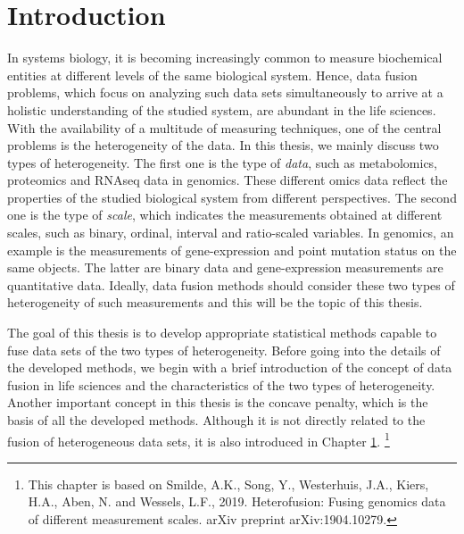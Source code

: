 \chapter{Introduction} \label{chapter:1}
In systems biology, it is becoming increasingly common to measure biochemical entities at different levels of the same biological system. Hence, data fusion problems, which focus on analyzing such data sets simultaneously to arrive at a holistic understanding of the studied system, are abundant in the life sciences. With the availability of a multitude of measuring techniques, one of the central problems is the heterogeneity of the data. In this thesis, we mainly discuss two types of heterogeneity. The first one is the type of \emph{data}, such as metabolomics, proteomics and RNAseq data in genomics. These different omics data reflect the properties of the studied biological system from different perspectives. The second one is the type of \emph{scale}, which indicates the measurements obtained at different scales, such as binary, ordinal, interval and ratio-scaled variables. In genomics, an example is the measurements of gene-expression and point mutation status on the same objects. The latter are binary data and gene-expression measurements are quantitative data. Ideally, data fusion methods should consider these two types of heterogeneity of such measurements and this will be the topic of this thesis.

The goal of this thesis is to develop appropriate statistical methods capable to fuse data sets of the two types of heterogeneity. Before going into the details of the developed methods, we begin with a brief introduction of the concept of data fusion in life sciences and the characteristics of the two types of heterogeneity. Another important concept in this thesis is the concave penalty, which is the basis of all the developed methods. Although it is not directly related to the fusion of heterogeneous data sets, it is also introduced in Chapter \ref{chapter:1}. \footnote{This chapter is based on Smilde, A.K., Song, Y., Westerhuis, J.A., Kiers, H.A., Aben, N. and Wessels, L.F., 2019. Heterofusion: Fusing genomics data of different measurement scales. arXiv preprint arXiv:1904.10279.}

